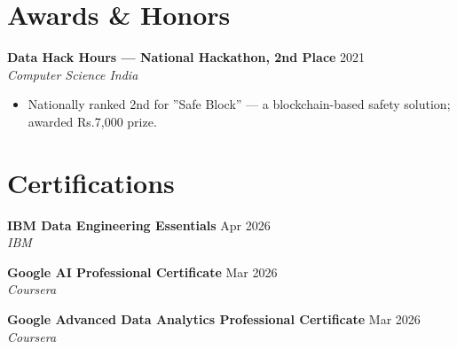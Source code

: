\documentclass[10pt,letterpaper]{article}
\begin{document}
\section{Awards \& Honors}

\textbf{Data Hack Hours --- National Hackathon, 2nd Place} \hfill 2021 \\
\textit{Computer Science India}
\begin{itemize}
  \item Nationally ranked 2nd for ''Safe Block'' --- a blockchain-based safety solution; awarded Rs.7,000 prize.
\end{itemize}

\section{Certifications}

\textbf{IBM Data Engineering Essentials} \hfill Apr 2026 \\
\textit{IBM}

\textbf{Google AI Professional Certificate} \hfill Mar 2026 \\
\textit{Coursera}

\textbf{Google Advanced Data Analytics Professional Certificate} \hfill Mar 2026 \\
\textit{Coursera}
\end{document}

